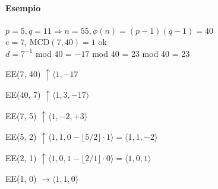 \documentclass[10pt]{book}
\begin{document}
\paragraph{Esempio} $p = 5, q = 11 \Rightarrow n = 55, \phi(n) = (p-1)(q-1) = 40$\\
$e = 7$, MCD$(7, 40) = 1$ ok\\
$d = 7^{-1}$ mod 40 = $-17$ mod $40$ = 23 mod 40 = 23
\begin{list}{}{}
	\item EE(7, 40) $\uparrow \langle1,\underline{-17}$
	\item EE(40, 7) $\uparrow \langle1,3,-17\rangle$
	\item EE(7, 5) $\uparrow \langle1,-2,+3\rangle$
	\item EE(5, 2) $\uparrow \langle1,1,0-\lfloor5/2\rfloor\cdot1\rangle = \langle1,1,-2\rangle$
	\item EE(2, 1) $\uparrow \langle1, 0, 1-\lfloor2/1\rfloor\cdot0\rangle = \langle1, 0, 1\rangle$
	\item EE(1, 0) $\rightarrow \langle1, 1, 0\rangle$
\end{list}
\end{document}
